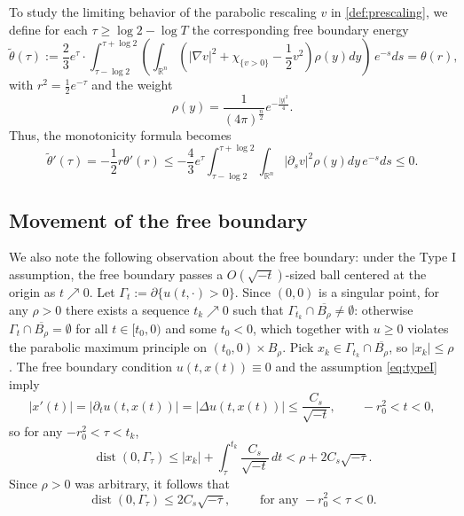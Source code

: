 \documentclass[11pt]{article}
\numberwithin{equation}{section}
\theoremstyle{definition}
\newcommand{\RR}{\mathbb{R}}
\DeclareMathOperator{\dist}{dist}
\begin{document}
To study the limiting behavior of the parabolic rescaling $v$ in \eqref{def:prescaling}, we define for each $\tau \geq \log 2 - \log T$ the corresponding free boundary energy
\begin{equation}\label{def:monres}
    \tilde{\theta} (\tau) := \frac23 e^{\tau} \cdot \int^{\tau+\log 2}_{\tau-\log 2} \left( \int_{\RR^n} \left( |\nabla v|^2 + \chi_{\{v>0\}} - \frac12 v^2 \right) \rho(y) dy \right) \, e^{-s} ds =  \theta(r),
\end{equation}
with $r^2= \frac12 e^{-\tau}$ and the weight
\begin{equation*}
	\rho(y) = \frac{1}{(4\pi)^{\frac{n}{2}}} e^{-\frac{|y|^2}{4}}. 
\end{equation*} 
Thus, the monotonicity formula becomes
\begin{equation}\label{eq:thetadissip}
\tilde{\theta}'(\tau) =-\frac12 r\theta'(r) \leq -\frac43 e^{\tau} \int_{\tau-\log 2}^{\tau+\log 2} \int_{\RR^n} |\partial_s v|^2 \rho(y)dy \, e^{-s}ds \leq 0.
\end{equation}


\subsection{Movement of the free boundary}

We also note the following observation about the free boundary: under the Type I assumption, the free boundary passes a $O(\sqrt{-t})$-sized ball centered at the origin as $t\nearrow 0$. Let $\Gamma_t:= \partial\{u(t,\cdot)>0\}$.
Since $(0,0)$ is a singular point, for any $\rho>0$ there exists a sequence $t_k \nearrow 0$ such that $\Gamma_{t_k} \cap \overline{B_\rho} \neq \emptyset$: otherwise $\Gamma_t \cap \overline{B_\rho} = \emptyset$ for all $t\in [t_0,0)$ and some $t_0<0$, which together with $u\geq 0$ violates the parabolic maximum principle on $(t_0,0)\times B_\rho$. Pick $x_k \in \Gamma_{t_k} \cap \overline{B_\rho}$, so $|x_k|\leq \rho$. The free boundary condition $u(t,x(t))\equiv 0$ and the assumption \eqref{eq:typeI} imply
\[ |x'(t)| = |\partial_t u(t,x(t))| = |\Delta u(t,x(t))| \leq \frac{C_s}{\sqrt{-t}}, \qquad -r_0^2< t<0, \]
so for any $-r_0^2 < \tau< t_k$,
\[ \dist(0, \Gamma_\tau) \leq |x_k| + \int_\tau^{t_k} \frac{C_s}{\sqrt{-t}}\, dt < \rho + 2C_s \sqrt{-\tau}. \]
Since $\rho>0$ was arbitrary, it follows that
\begin{equation}\label{eq:fbnear0}
    \dist(0, \Gamma_\tau) \leq 2C_s \sqrt{-\tau}, \qquad \text{ for any } -r_0^2 < \tau <0.
\end{equation}
\end{document}
